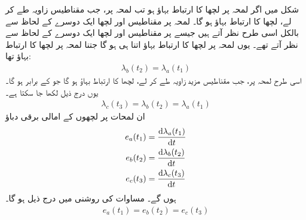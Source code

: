  شکل   میں اگر لمحہ  پر  لچھا  کا  ارتباط بہاؤ  ہو تب لمحہ  پر، جب مقناطیس  زاویہ طے کر لے،   لچھا  کا ارتباط بہاؤ  ہو گا۔  لمحہ  پر مقناطیس اور لچھا  ایک دوسرے کے لحاظ سے بالکل اسی طرح نظر آتے  ہیں جیسے  پر مقناطیس اور لچھا  ایک دوسرے کے لحاظ سے نظر آتے تھے۔ یوں لمحہ  پر لچھا  کا ارتباط بہاؤ  اتنا ہی ہو گا جتنا لمحہ  پر   لچھا کا ارتباط بہاؤ تھا:
\begin{align}
\lambda_b(t_2)=\lambda_a(t_1)
\end{align}
اسی طرح  لمحہ  پر، جب مقناطیس مزید   زاویہ طے کر لے، لچھا  کا ارتباط بہاؤ   ہو گا جو  کے برابر ہو گا۔یوں درج ذیل لکھا جا سکتا ہے۔
\begin{align}\label{مساوات_گھومتے_مشین_مختلف_اوقات_پر_تین_لچھے_یکساں}
\lambda_c(t_3)=\lambda_b(t_2)=\lambda_a(t_1)
\end{align}
ان لمحات پر  لچھوں کے امالی برقی دباؤ
\begin{align}
e_a(t_1)&=\frac{\dif \lambda_a(t_1)}{\dif t}\\
e_b(t_2)&=\frac{\dif \lambda_b(t_2)}{\dif t}\\
e_c(t_3)&=\frac{\dif \lambda_c(t_3)}{\dif t}
\end{align}
ہوں گے۔ مساوات     کی روشنی میں درج ذیل ہو گا۔
\begin{align}\label{مساوات_گھومتے_مشین_تین_لمحات_دباو_یکساں}
e_a(t_1)=e_b(t_2)=e_c(t_3)
\end{align} 

